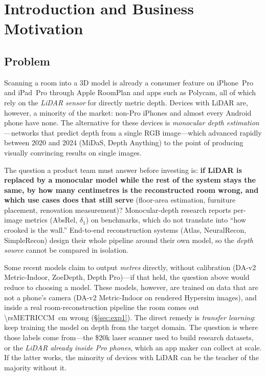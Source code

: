\section{Introduction and Business Motivation}

\subsection{Problem}
Scanning a room into a 3D model is already a consumer feature on iPhone~Pro and iPad~Pro through Apple RoomPlan and
apps such as Polycam, all of which rely on the \emph{LiDAR sensor} for directly metric depth. Devices with LiDAR are,
however, a minority of the market: non-Pro iPhones and almost every Android phone have none. The alternative for these
devices is \emph{monocular depth estimation}---networks that predict depth from a single RGB image---which advanced
rapidly between 2020 and 2024 (MiDaS, Depth Anything) to the point of producing visually convincing results on single images.

The question a product team must answer before investing is: \textbf{if LiDAR is replaced by a monocular model while the
rest of the system stays the same, by how many centimetres is the reconstructed room wrong, and which use cases does that
still serve} (floor-area estimation, furniture placement, renovation measurement)? Monocular-depth research reports
per-image metrics (AbsRel, $\delta_1$) on benchmarks, which do not translate into ``how crooked is the wall.''
End-to-end reconstruction systems (Atlas, NeuralRecon, SimpleRecon) design their whole pipeline around their own model,
so the \emph{depth source} cannot be compared in isolation.

Some recent models claim to output \emph{metres} directly, without calibration (DA-v2 Metric-Indoor, ZoeDepth, Depth
Pro)---if that held, the question above would reduce to choosing a model. These models, however, are trained on data
that are not a phone's camera (DA-v2 Metric-Indoor on rendered Hypersim images), and inside a real room-reconstruction
pipeline the room comes out \SI{\rsMETRICCM}{cm} wrong (\S\ref{sec:exp1}). The direct remedy is \emph{transfer
learning}: keep training the model on depth from the target domain. The question is where those labels come from---the
\$20k laser scanner used to build research datasets, or the \emph{LiDAR already inside Pro phones}, which an app maker
can collect at scale. If the latter works, the minority of devices with LiDAR can be the teacher of the majority
without it.

